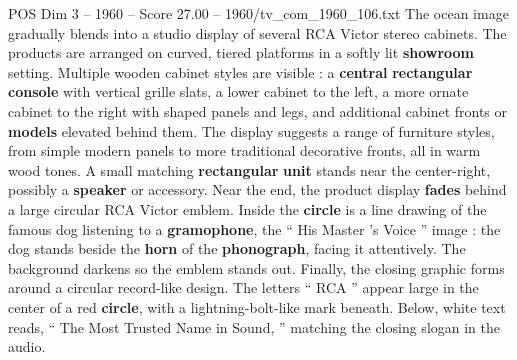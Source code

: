 \begin{textsample}{POS Dim 3 – 1960 – Score 27.00 – 1960/tv\_com\_1960\_106.txt}
The ocean image gradually blends into a studio display of several RCA Victor stereo cabinets.
The products are arranged on curved, tiered platforms in a softly lit \textbf{showroom} setting.
Multiple wooden cabinet styles are visible : a \textbf{central} \textbf{rectangular} \textbf{console} with vertical grille slats, a lower cabinet to the left, a more ornate cabinet to the right with shaped panels and legs, and additional cabinet fronts or \textbf{models} elevated behind them.
The display suggests a range of furniture styles, from simple modern panels to more traditional decorative fronts, all in warm wood tones.
A small matching \textbf{rectangular} \textbf{unit} stands near the center-right, possibly a \textbf{speaker} or accessory.
Near the end, the product display \textbf{fades} behind a large circular RCA Victor emblem.
Inside the \textbf{circle} is a line drawing of the famous dog listening to a \textbf{gramophone}, the “ His Master ’s Voice ” image : the dog stands beside the \textbf{horn} of the \textbf{phonograph}, facing it attentively.
The background darkens so the emblem stands out.
Finally, the closing graphic forms around a circular record-like design.
The letters “ RCA ” appear large in the center of a red \textbf{circle}, with a lightning-bolt-like mark beneath.
Below, white text reads, “ The Most Trusted Name in Sound, ” matching the closing slogan in the audio.

\end{textsample}
